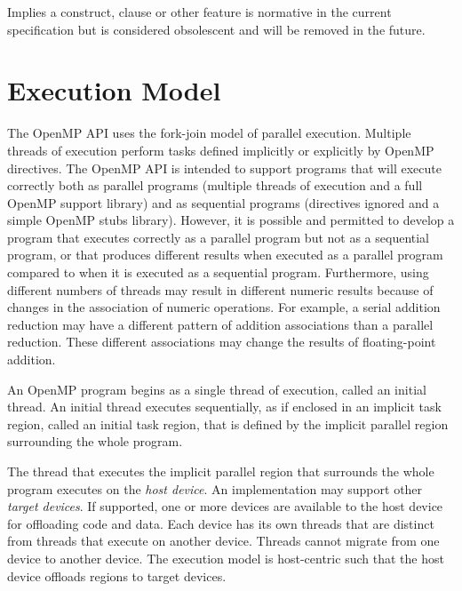 \glossarydefstart
Implies a construct, clause or other feature is normative in the current specification but is considered obsolescent and will be removed in the future.
\glossarydefend








\section{Execution Model}
\label{sec:Execution Model}
The OpenMP API uses the fork-join model of parallel execution. Multiple threads of
execution perform tasks defined implicitly or explicitly by OpenMP directives. The
OpenMP API is intended to support programs that will execute correctly both as parallel
programs (multiple threads of execution and a full OpenMP support library) and as
sequential programs (directives ignored and a simple OpenMP stubs library). However,
it is possible and permitted to develop a program that executes correctly as a parallel
program but not as a sequential program, or that produces different results when 
executed as a parallel program compared to when it is executed as a sequential program. 
Furthermore, using different numbers of threads may result in different numeric results 
because of changes in the association of numeric operations. For example, a serial 
addition reduction may have a different pattern of addition associations than a parallel 
reduction. These different associations may change the results of floating-point addition.

An OpenMP program begins as a single thread of execution, called an initial thread. An 
initial thread executes sequentially, as if enclosed in an implicit task region, called an 
initial task region, that is defined by the implicit parallel region surrounding the whole 
program.

The thread that executes the implicit parallel region that surrounds the whole program 
executes on the \emph{host device}. An implementation may support 
other \emph{target devices}. If
supported, one or more devices are available to the host device for offloading code and 
data. Each device has its own threads that are distinct from threads that execute on 
another device. Threads cannot migrate from one device to another device. The 
execution model is host-centric such that the host device offloads  regions to
target devices.

